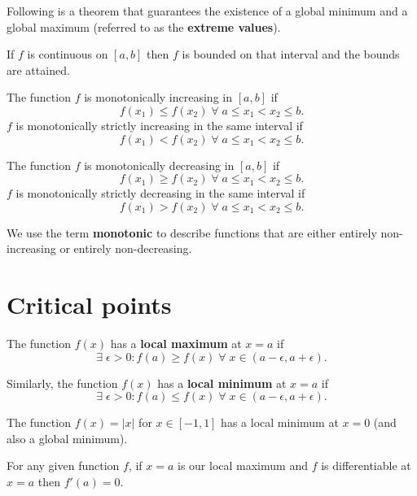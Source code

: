 Following is a theorem that guarantees the existence of a global minimum and a global maximum (referred to as the \textbf{extreme values}).

\begin{theorem}
	If $f$ is continuous on $[a,b]$ then $f$ is bounded on that interval and the bounds are attained.
\end{theorem}

\begin{definition}
	The function $f$ is monotonically increasing in $[a,b]$ if \[f(x_1)\leq f(x_2)\;\forall\;a\leq x_1<x_2\leq b.\] $f$ is monotonically strictly increasing in the same interval if \[f(x_1)<f(x_2)\;\forall\;a\leq x_1<x_2\leq b.\]
\end{definition}

\begin{definition}
	The function $f$ is monotonically decreasing in $[a,b]$ if \[f(x_1)\geq f(x_2)\;\forall\;a\leq x_1<x_2\leq b.\] $f$ is monotonically strictly decreasing in the same interval if \[f(x_1)>f(x_2)\;\forall\;a\leq x_1<x_2\leq b.\]
\end{definition}

\begin{remark}
	We use the term \textbf{monotonic} to describe functions that are either entirely non-increasing or entirely non-decreasing.
\end{remark}

\section{Critical points}

\begin{definition}
	The function $f(x)$ has a \textbf{local maximum} at $x=a$ if \[\exists\;\epsilon>0:f(a)\geq f(x)\;\forall\;x\in(a-\epsilon,a+\epsilon).\]
	
	Similarly, the function $f(x)$ has a \textbf{local minimum} at $x=a$ if \[\exists\;\epsilon>0:f(a)\leq f(x)\;\forall\;x\in(a-\epsilon,a+\epsilon).\]
\end{definition}

\begin{example}
	The function $f(x)=|x|$ for $x\in[-1,1]$ has a local minimum at $x=0$ (and also a global minimum).
\end{example}

\begin{remark}
	For any given function $f$, if $x=a$ is our local maximum and $f$ is differentiable at $x=a$ then $f'(a)=0$.
\end{remark}


